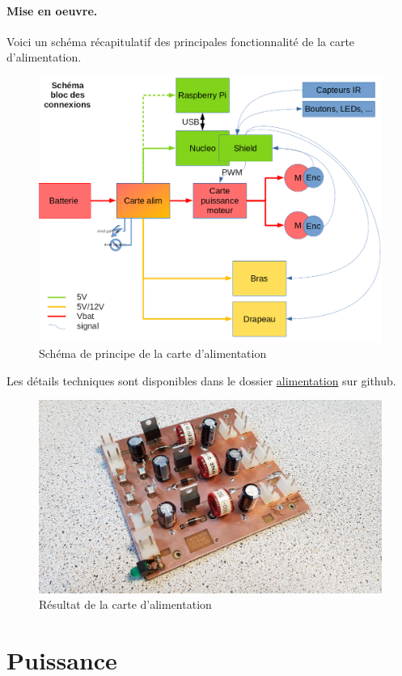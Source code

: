 \documentclass[a4paper,10pt]{report}
\begin{document}
\begin{spacing}{1.5}
\paragraph{Mise en oeuvre.} Voici un schéma récapitulatif des principales fonctionnalité de la carte d'alimentation.
\begin{figure}[H]
  \center
  \includegraphics[scale=0.4]{schema_bloc_connexions.png}
  \caption{Schéma de principe de la carte d'alimentation}
\end{figure}
Les détails techniques sont disponibles dans le dossier
\href{https://github.com/eirbot/eirbot2020-1A/tree/master/alim}{alimentation}
sur github.
\begin{figure}[H]
  \center
  \includegraphics[scale=0.5]{alimentation.jpg}
  \caption{Résultat de la carte d'alimentation}
\end{figure}

\section{Puissance}

\end{spacing}
\end{document}
